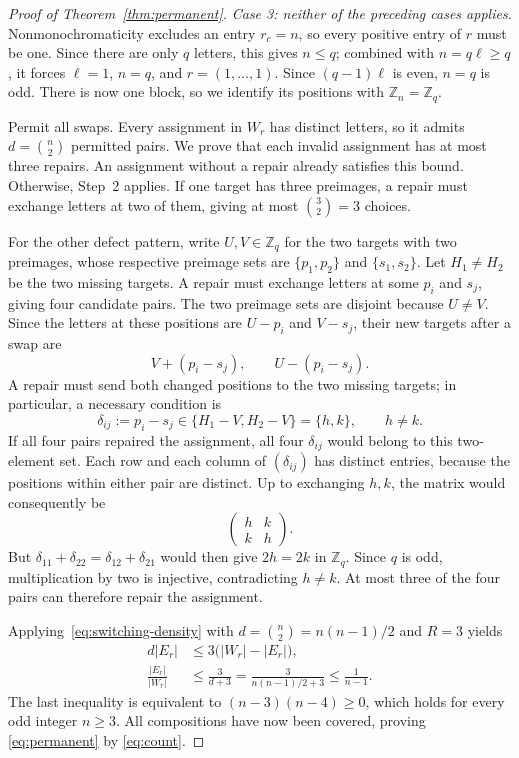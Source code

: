\documentclass[10pt,a4paper]{amsart}
\newcommand{\Z}{\mathbb Z}
\begin{document}
\begin{proof}[Proof of Theorem~\ref{thm:permanent}]
\emph{Case 3: neither of the preceding cases applies.}
Nonmonochromaticity excludes an entry \(r_c=n\), so every positive
entry of \(r\) must be one. Since there are only \(q\) letters,
this gives \(n\leq q\); combined with \(n=q\ell\geq q\), it
forces \(\ell=1\), \(n=q\), and
\(r=(1,\ldots,1)\). Since \((q-1)\ell\) is even, \(n=q\)
is odd. There is now one block, so we identify its positions with
\(\Z_n=\Z_q\).

Permit all swaps. Every assignment in \(W_r\) has distinct letters,
so it admits \(d=\binom n2\) permitted pairs. We prove that each
invalid assignment has at most three repairs. An assignment without
a repair already satisfies this bound. Otherwise, Step~2 applies.
If one target has three preimages, a repair must exchange letters
at two of them, giving at most \(\binom32=3\) choices.

For the other defect pattern, write \(U,V\in\Z_q\) for the
two targets with two preimages, whose respective preimage sets are
\(\{p_1,p_2\}\) and \(\{s_1,s_2\}\). Let \(H_1\ne H_2\)
be the two missing targets. A repair must exchange letters at some
\(p_i\) and \(s_j\), giving four candidate pairs. The two
preimage sets are disjoint because \(U\ne V\). Since the letters at these positions
are \(U-p_i\) and \(V-s_j\), their new targets after a swap are
\begin{equation}
 V+(p_i-s_j),\qquad U-(p_i-s_j).
\end{equation}
A repair must send both changed positions to the two missing targets;
in particular, a necessary condition is
\begin{equation}
 \delta_{ij}:=p_i-s_j\in
 \{H_1-V,H_2-V\}=\{h,k\},\qquad h\ne k.
\end{equation}
If all four pairs repaired the assignment, all four \(\delta_{ij}\)
would belong to this two-element set. Each row and each column of
\((\delta_{ij})\) has distinct entries, because the positions within
either pair are distinct. Up to exchanging \(h,k\), the matrix
would consequently be
\begin{equation}
 \begin{pmatrix}h&k\\k&h\end{pmatrix}.
\end{equation}
But
\(\delta_{11}+\delta_{22}=\delta_{12}+\delta_{21}\)
would then give \(2h=2k\) in \(\Z_q\).
Since \(q\) is odd, multiplication by two is injective, contradicting
\(h\ne k\). At most three of the four pairs can therefore repair the
assignment.

Applying~\eqref{eq:switching-density} with
\(d=\binom n2=n(n-1)/2\) and \(R=3\) yields
\begin{equation}\label{eq:three}
 \begin{aligned}
 d|E_r|&\leq3\bigl(|W_r|-|E_r|\bigr),\\
 \frac{|E_r|}{|W_r|}
 &\leq\frac3{d+3}
 =\frac3{n(n-1)/2+3}\leq\frac1{n-1}.
 \end{aligned}
\end{equation}
The last inequality is equivalent to
\((n-3)(n-4)\geq0\), which holds for every odd integer \(n\geq3\).
All compositions have now been covered, proving
\eqref{eq:permanent} by \eqref{eq:count}.
\end{proof}
\end{document}
